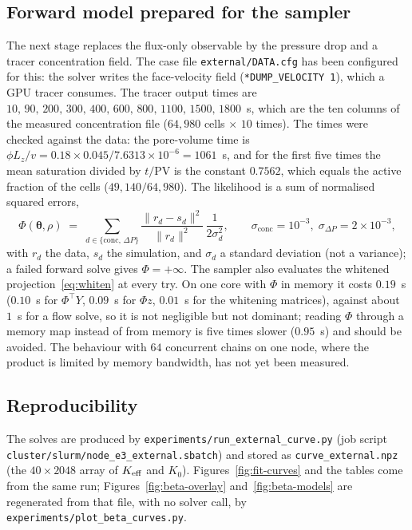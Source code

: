 \subsection{Forward model prepared for the sampler}
\label{sec:sampler-prep}
The next stage replaces the flux-only observable by the pressure drop and a tracer concentration field. The case file \texttt{external/DATA.cfg} has been configured for this: the solver writes the face-velocity field (\texttt{*DUMP\_VELOCITY 1}), which a GPU tracer consumes. The tracer output times are $10,\,90,\,200,\,300,\,400,\,600,\,800,\,1100,\,1500,\,1800$~s, which are the ten columns of the measured concentration file ($64{,}980$ cells $\times$ $10$ times). The times were checked against the data: the pore-volume time is $\phi L_z/v=0.18\times0.045/7.6313\times10^{-6}=1061$~s, and for the first five times the mean saturation divided by $t/\mathrm{PV}$ is the constant $0.7562$, which equals the active fraction of the cells ($49{,}140/64{,}980$). The likelihood is a sum of normalised squared errors,
\begin{equation}
  \Phi(\boldsymbol\theta,\rho)\;=\;\sum_{d\in\{\mathrm{conc},\,\Delta P\}}\frac{\lVert r_d-s_d\rVert^2}{\lVert r_d\rVert^2}\,\frac1{2\sigma_d^2},
  \qquad \sigma_{\mathrm{conc}}=10^{-3},\;\sigma_{\Delta P}=2\times10^{-3},
  \label{eq:likelihood}
\end{equation}
with $r_d$ the data, $s_d$ the simulation, and $\sigma_d$ a standard deviation (not a variance); a failed forward solve gives $\Phi=+\infty$. The sampler also evaluates the whitened projection~\eqref{eq:whiten} at every try. On one core with $\Phi$ in memory it costs $0.19$~s ($0.10$~s for $\Phi^{\top}Y$, $0.09$~s for $\Phi z$, $0.01$~s for the whitening matrices), against about $1$~s for a flow solve, so it is not negligible but not dominant; reading $\Phi$ through a memory map instead of from memory is five times slower ($0.95$~s) and should be avoided. The behaviour with $64$ concurrent chains on one node, where the product is limited by memory bandwidth, has not yet been measured.

\subsection{Reproducibility}
The solves are produced by \texttt{experiments/run\_external\_curve.py} (job script \texttt{cluster/slurm/node\_e3\_external.sbatch}) and stored as \texttt{curve\_external.npz} (the $40\times2048$ array of $K_{\mathrm{eff}}$ and $K_0$). Figures~\ref{fig:fit-curves} and the tables come from the same run; Figures~\ref{fig:beta-overlay} and~\ref{fig:beta-models} are regenerated from that file, with no solver call, by \texttt{experiments/plot\_beta\_curves.py}.
